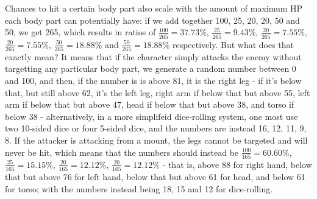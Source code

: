 Chances to hit a certain body part also scale with the amount of maximum HP each body part can potentially have: if we add together 100, 25, 20, 20, 50 and 50, we get 265, which results in ratios of $ \frac{100}{265}=37.73\% $, $ \frac{25}{265}=9.43\% $, $ \frac{20}{265}=7.55\% $, $ \frac{20}{265}=7.55\% $, $ \frac{50}{265}=18.88\% $ and $ \frac{50}{265}=18.88\% $ respectively. But what does that exactly mean? It means that if the character simply attacks the enemy without targetting any particular body part, we generate a random number between 0 and 100, and then, if the number is is above 81, it is the right leg - if it's below that, but still above 62, it's the left leg, right arm if below that but above 55, left arm if below that but above 47, head if below that but above 38, and torso if below 38 - alternatively, in a more simplifeid dice-rolling system, one most use two 10-sided dice or four 5-sided dice, and the numbers are instead 16, 12, 11, 9, 8.\newline
If the attacker is attacking from a mount, the legs cannot be targeted and will never be hit, which means that the numbers should instead be $ \frac{100}{165}=60.60\% $, $ \frac{25}{165}=15.15\% $, $ \frac{20}{165}=12.12\% $, $ \frac{20}{165}=12.12\% $ - that is, above 88 for right hand, below that but above 76 for left hand, below that but above 61 for head, and below 61 for torso; with the numbers instead being 18, 15 and 12 for dice-rolling.
